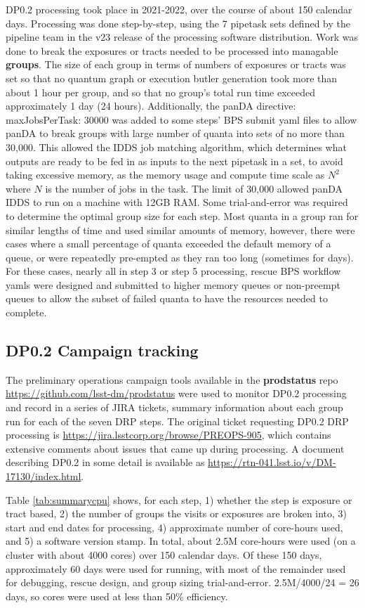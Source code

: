 \documentclass[OPS,authoryear,toc]{lsstdoc}
\begin{document}
DP0.2 processing took place in 2021-2022, over the course of about 150
calendar days.  Processing was done step-by-step, using the 7 pipetask
sets defined by the pipeline team in the v23 release of the processing
software distribution.  Work was done to break the exposures or tracts
needed to be processed into managable {\bf groups}.  The size of each
group in terms of numbers of exposures or tracts was set so that no
quantum graph or execution butler generation took more than about 1
hour per group, and so that no group's total run time exceeded
approximately 1 day (24 hours).  
Additionally, the panDA directive:
{\rm maxJobsPerTask: 30000} was added to some steps' BPS submit yaml
files to allow panDA to break groups with large number of quanta into
sets of no more than 30,000.  This allowed the IDDS job matching
algorithm, which determines what outputs are ready to be fed in as
inputs to the next pipetask in a set, to avoid taking excessive
memory, as the memory usage and compute time scale as $N^2$ where $N$
is the number of jobs in the task.  The limit of 30,000 allowed panDA
IDDS to run on a machine with 12GB RAM.  Some trial-and-error was
required to determine the optimal group size for each step.  Most
quanta in a group ran for similar lengths of time and used similar
amounts of memory, however, there were cases where a small percentage
of quanta exceeded the default memory of a queue, or were repeatedly
pre-empted as they ran too long (sometimes for days).  For these
cases, nearly all in step 3 or step 5 processing, rescue BPS workflow
yamls were designed and submitted to higher memory queues or 
non-preempt queues to allow the subset of failed quanta to have the
resources needed to complete.

\subsection{DP0.2 Campaign tracking}
The preliminary operations campaign tools available in the {\bf
  prodstatus} repo \url{https://github.com/lsst-dm/prodstatus} were
used to monitor DP0.2 processing and record in a series of JIRA
tickets, summary information about each group run for each of the
seven DRP steps.   The original ticket requesting DP0.2 DRP processing is \url{
  https://jira.lsstcorp.org/browse/PREOPS-905}, which contains 
  extensive comments about issues that came up during processing. 
  A document describing DP0.2 in some detail is available 
  as \url{https://rtn-041.lsst.io/v/DM-17130/index.html}.

Table \ref{tab:summarycpu} shows, for each step, 1) whether the step is
exposure or tract based, 2) the number of groups the visits or
exposures are broken into, 3) start and end dates for processing,
4) approximate number of core-hours used, and 5) a software version
stamp. In total, about 2.5M core-hours were used (on a cluster with about
4000 cores) over 150 calendar days.  Of these 150 days, approximately
60 days were used for running, with most of the remainder used for
debugging, rescue design, and group sizing trial-and-error.  
2.5M/4000/24 = 26 days, so cores were used at less than 50\% efficiency.
\end{document}
